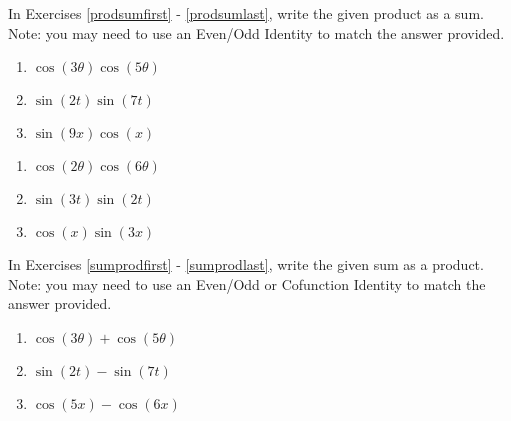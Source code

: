 \documentclass{ximera}
\begin{document}
In Exercises \ref{prodsumfirst} - \ref{prodsumlast}, write the  given product as a sum. Note: you may need to use an Even/Odd Identity to match the answer provided.

\begin{multicols}{3}

\begin{enumerate}

\setcounter{enumi}{\value{HW}}

\item $\cos(3\theta)\cos(5\theta)$ \label{prodsumfirst}
\item $\sin(2t)\sin(7t)$
\item $\sin(9x)\cos(x)$

\setcounter{HW}{\value{enumi}}

\end{enumerate}

\end{multicols}

\begin{multicols}{3}

\begin{enumerate}

\setcounter{enumi}{\value{HW}}

\item $\cos(2\theta) \cos(6\theta)$
\item $\sin(3t) \sin(2t)$
\item $\cos(x) \sin(3x)$ \label{prodsumlast}

\setcounter{HW}{\value{enumi}}

\end{enumerate}

\end{multicols}

In Exercises \ref{sumprodfirst} - \ref{sumprodlast},  write the given sum as a product. Note:  you may need to use an Even/Odd or Cofunction Identity to match the answer provided.

\begin{multicols}{3}

\begin{enumerate}

\setcounter{enumi}{\value{HW}}

\item $\cos(3\theta) + \cos(5\theta)$ \label{sumprodfirst}
\item $\sin(2t) - \sin(7t)$
\item $\cos(5x) - \cos(6x)$

\setcounter{HW}{\value{enumi}}

\end{enumerate}

\end{multicols}
\end{document}
